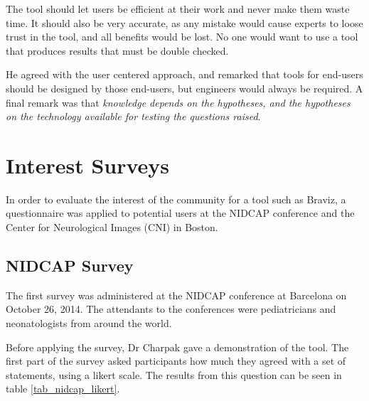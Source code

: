 The tool should let users be efficient at their work and never make them waste time. It should also be very accurate, as any mistake would cause experts to loose trust in the tool, and all benefits would be lost. No one would want to use a tool that produces results that must be double checked.

He agreed with the user centered approach, and remarked that tools for end-users should be designed by those end-users, but engineers would always be required.
A final remark was that \emph{knowledge depends on the hypotheses, and the hypotheses on the technology available for testing the questions raised}. 

\section{Interest Surveys}

In order to evaluate the interest of the community for a tool such as Braviz, a questionnaire was applied to potential users at the NIDCAP conference and the Center for Neurological Images (CNI) in Boston.

\subsection{NIDCAP Survey}

The first survey was administered at the NIDCAP conference at Barcelona on October 26, 2014. The attendants to the conferences were pediatricians and neonatologists from around the world. 

Before applying the survey, Dr Charpak gave a demonstration of the tool. The first part of the survey asked participants how much they agreed with a set of statements, using a likert scale. The results from this question can be seen in table \ref{tab_nidcap_likert}. 

